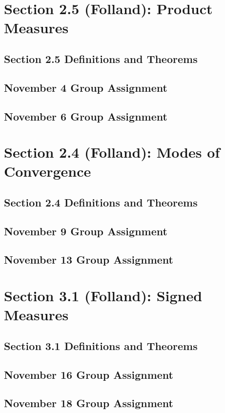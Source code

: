 \documentclass[11pt]{amsart}
\begin{document}
\section{Section 2.5 (Folland): Product Measures}

\subsection{Section 2.5 Definitions and Theorems}
 
\clearpage
\subsection{November 4 Group Assignment}

\clearpage
\subsection{November 6 Group Assignment}
 
\section{Section 2.4 (Folland): Modes of Convergence}

\subsection{Section 2.4 Definitions and Theorems}
 
\subsection{November 9 Group Assignment}
 

\subsection{November 13 Group Assignment}

 \section{Section 3.1 (Folland): Signed Measures}
 \clearpage
 \subsection{Section 3.1 Definitions and Theorems}
 
 \subsection{November 16 Group Assignment}
 

 \subsection{November 18 Group Assignment}
   
\end{document}
